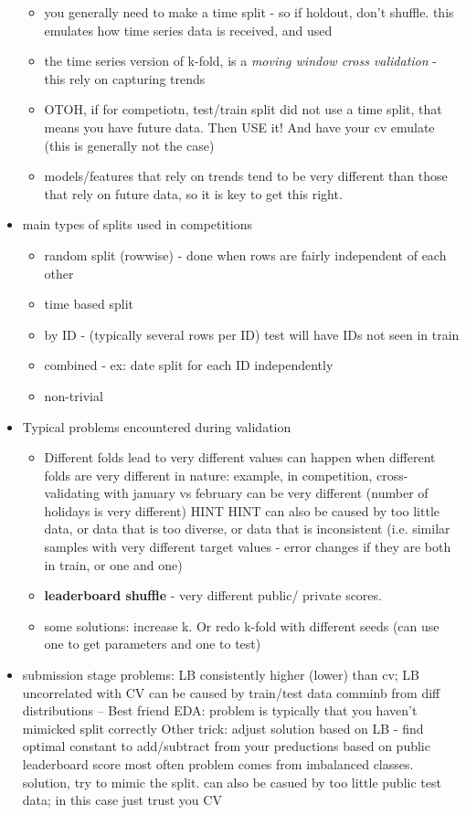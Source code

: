 \documentclass[a4paper]{report}
\begin{document}
\begin{itemize}
    \begin{itemize}
      \item you generally need to make a time split - so if holdout, don't shuffle.
	\subitem this emulates how time series data is received, and used
      \item the time series version of k-fold, is a \emph{moving window cross validation} - this rely on capturing trends
      \item OTOH, if for competiotn, test/train split did not use a time split, that means you have future data. Then USE it! And have your cv emulate (this is generally not the case)
      \item models/features that rely on trends tend to be very different than those that rely on future data, so it is key to get this right.
    \end{itemize}
  \item main types of splits used in competitions
    \begin{itemize}
      \item random split (rowwise) - done when rows are fairly independent of each other
      \item time based split
      \item by ID - (typically several rows per ID)
	\subitem test will have IDs not seen in train
      \item combined - ex: date split for each ID independently
      \item non-trivial
    \end{itemize}
  \item Typical problems encountered during validation
    \begin{itemize}
      \item Different folds lead to very different values
	\subitem can happen when different folds are very different in nature: example, in competition, cross-validating with january vs february can be very different (number of holidays is very different) {\color{red} HINT HINT}
	\subitem can also be caused by too little data, or data that is too diverse, or data that is inconsistent (i.e. similar samples with very different target values - error changes if they are both in train, or one and one)
      \item {\bf leaderboard shuffle} - very different public/ private scores.
      \item some solutions: increase k. Or redo k-fold with different seeds (can use one to get parameters and one to test)
    \end{itemize}
  \item submission stage problems: LB consistently higher (lower) than cv; LB uncorrelated with CV 
    \subitem can be caused by train/test data comminb from diff distributions -- Best friend EDA: problem is typically that you haven't mimicked split correctly
    \subitem Other trick: adjust solution based on LB - find optimal constant to add/subtract from your preductions based on public leaderboard score
    \subitem most often problem comes from imbalanced classes. solution, try to mimic the split.
    \subitem can also be casued by too little public test data; in this case just trust you CV
\end{itemize}
\end{document}

